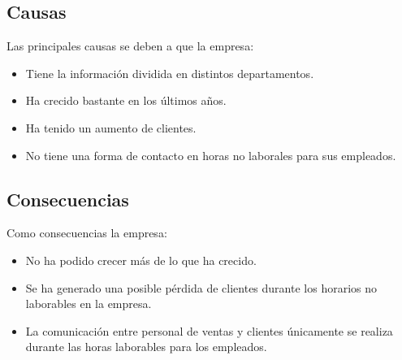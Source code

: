 \subsection{Causas}
Las principales causas se deben a que la empresa:
\begin{itemize}
    \item Tiene la información dividida en distintos departamentos.
    \item Ha crecido bastante en los últimos años.
    \item Ha tenido un aumento de clientes.
    \item No tiene una forma de contacto en horas no laborales para sus empleados.
\end{itemize}

\subsection{Consecuencias}
Como consecuencias la empresa:
\begin{itemize}
    \item No ha podido crecer más de lo que ha crecido.
    \item Se ha generado una posible pérdida de clientes durante los horarios no laborables en la empresa.
    \item La comunicación entre personal de ventas y clientes únicamente se realiza durante las horas laborables para los empleados.
\end{itemize}


